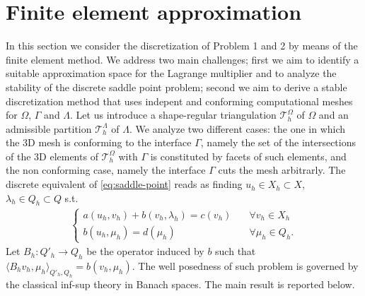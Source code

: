 \section{Finite element approximation}
In this section we consider the discretization of Problem 1 and 2 by means of the finite element method. We address two main challenges; first we aim to identify a suitable approximation space for the Lagrange multiplier and to analyze the stability of the discrete saddle point problem; second we aim to derive a stable discretization method that uses indepent and conforming computational meshes for $\Omega$, $\Gamma$ and $\Lambda$. Let us introduce a shape-regular triangulation $\mathcal{T}^{\Omega}_h$ of $\Omega$ and an admissible partition $\mathcal{T}^{\Lambda}_{h}$ of $\Lambda$.
We analyze two different cases: the one in which the 3D mesh is conforming to the interface $\Gamma$, namely the set of the intersections of the 3D elements of $\mathcal{T}^{\Omega}_h$ with $\Gamma$ is constituted by facets of such elements, and the non conforming case, namely the interface $\Gamma$ cuts the mesh arbitrarly. The discrete equivalent of \eqref{eq:saddle-point} reads as finding $u_h\in X_h\subset X$, $\lambda_h\in Q_h\subset Q$ s.t.
\begin{eqnarray}\label{eq:saddle-point_discrete}
\begin{cases}
a(u_h,v_h)+b(v_h,\lambda_h)=c(v_h)\quad &\forall v_h\in X_h\\
b(u_h,\mu_h)=d(\mu_h) \quad &\forall \mu_h\in Q_h.
\end{cases}
\end{eqnarray}
Let $B_h: Q'_h \longrightarrow Q_h$ be the operator induced by $b$ such that $\langle B_h v_h,\mu _h\rangle_{Q'_h,Q_h} = b(v_h,\mu _h)$.
The well posedness of such problem is governed by the classical inf-sup theory in Banach spaces. The main result is reported below.

